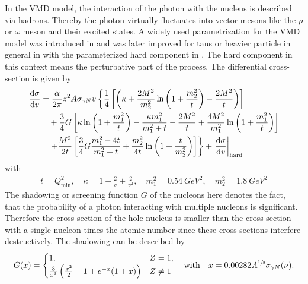 In the VMD model, the interaction of the photon with the nucleus is described via hadrons.
Thereby the photon virtually fluctuates into vector mesons like the $\rho$ or $\omega$ meson and their excited states.
A widely used parametrization for the VMD model was introduced in \cite{Bezrukov80, Bezrukov81} and was later improved for taus or heavier particle in general in \cite{Bugaev03HardComponent} with the parameterized hard component in \cite{Bugaev04HardComponent}.
The hard component in this context means the perturbative part of the process.
The differential cross-section is given by
\begin{equation} \label{eq:photo_dsigma_vmd}
    \begin{aligned}
    \frac{\dif \sigma}{\dif v} &=
        \frac{\alpha}{2\pi} z^2 A \sigma_{\gamma N} v %
        \left\{
            \frac14 \left[ \left( \kappa + \frac{2 M^2}{m_2^2} \logn \left( 1 + \frac{m_2^2}{t} \right) - \frac{2 M^2}{t} \right) \right] \right. \\
        & \quad
            + \frac34 G \left[ \kappa \logn \left( 1 + \frac{m_1^2}{t} \right) - \frac{\kappa m_1^2}{m_1^2 + t} - \frac{2 M^2}{t} + \frac{4 M^2}{m_1^2} \logn \left(1 + \frac{m_1^2}{t} \right) \right] \\
        & \quad
        \left.
            + \frac{M^2}{2t} \left[ \frac34 G \frac{m_1^2 - 4t}{m_1^2 + t} + \frac{m_2^2}{4t} \logn \left( 1 + \frac{t}{m_2^2} \right) \right]
        \right\} + 
        \left. \frac{\dif \sigma}{\dif v} \right|_{\text{hard}}
    \end{aligned}
\end{equation}
with
\begin{align}
    t = Q_{\text{min}}^2,
    \quad
    \kappa = 1 - \frac2v + \frac{2}{v^2},
    \quad
    m_1^2 = \SI{0.54}{GeV^2},
    \quad
    m_2^2 = \SI{1.8}{GeV^2}
\end{align}
The shadowing or screening function $G$ of the nucleons here denotes the fact, that the probability of a photon interacting with multiple nucleons is significant.
Therefore the cross-section of the hole nucleus is smaller than the cross-section with a single nucleon times the atomic number since these cross-sections interfere destructively.
The shadowing can be described by \cite{Bezrukov81}
\begin{align} \label{eq:photo_vmd_shadow}
    G(x) = 
    \begin{cases}
        1, & Z = 1, \\
        \frac{3}{x^3} \left( \frac{x^2}{2} - 1 + e^{-x}(1 + x) \right) & Z \neq 1
    \end{cases}
    \quad \text{with} \quad
    x = 0.00282 A^{\sfrac13} \sigma_{\gamma N}(\nu) .
\end{align}
